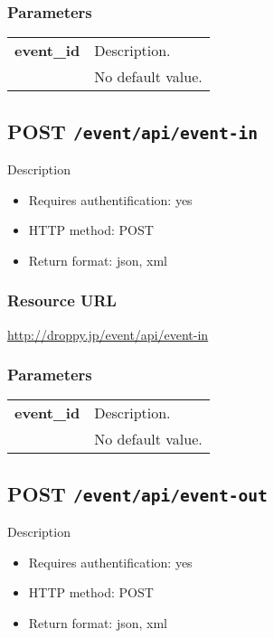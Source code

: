 \documentclass[11pt,a4paper]{article}
\newcommand{\content}[1]{\begin{minipage}{10cm}\vspace{2mm}#1\vspace{2mm}\end{minipage}}
\begin{document}
  \subsubsection*{Parameters}
  \begin{table}[h]
    \begin{center}
      \begin{tabular}{l l}
        \hline 
      \textbf{event\_id} & \content{Description. }
      \\
       & No default value.\\
      \hline
      \end{tabular}
    \end{center}
  \end{table}
  
      \newpage
      
      
  \subsection*{POST {\tt /event/api/event-in}}
  Description
  \begin{itemize}
  \item Requires authentification: yes
  \item HTTP method: POST
  \item Return format: json, xml
  \end{itemize}
  \subsubsection*{Resource URL}
  \url{http://droppy.jp/event/api/event-in}
  \subsubsection*{Parameters}
  \begin{table}[h]
    \begin{center}
      \begin{tabular}{l l}
        \hline 
      \textbf{event\_id} & \content{Description. }
      \\
       & No default value.\\
      \hline
      \end{tabular}
    \end{center}
  \end{table}
  
      \newpage
      
      
  \subsection*{POST {\tt /event/api/event-out}}
  Description
  \begin{itemize}
  \item Requires authentification: yes
  \item HTTP method: POST
  \item Return format: json, xml
  \end{itemize}
\end{document}
